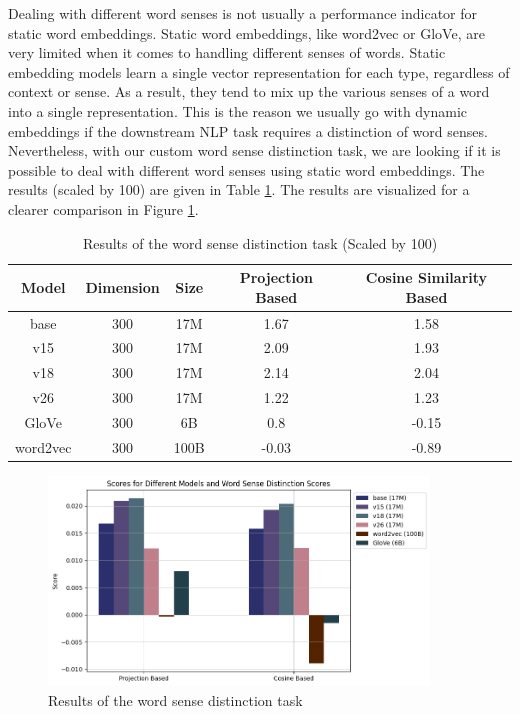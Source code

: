 Dealing with different word senses is not usually a performance indicator for static word embeddings. Static word embeddings, like word2vec or GloVe, are very limited when it comes to handling different senses of words. Static embedding models learn a single vector representation for each type, regardless of context or sense. As a result, they tend to mix up the various senses of a word into a single representation. This is the reason we usually go with dynamic embeddings if the downstream \ac{NLP} task requires a distinction of word senses. Nevertheless, with our custom word sense distinction task, we are looking if it is possible to deal with different word senses using static word embeddings. The results (scaled by 100) are given in Table \ref{tab:word-sense-tab}. The results are visualized for a clearer comparison in Figure \ref{fig:sense-plot}.

\begin{table}[h]
\centering
\begin{tabular}{|ccc|cc|}
\hline
Model & Dimension & Size & Projection Based & Cosine Similarity Based \\ \hline
base & 300 & 17M & 1.67 & 1.58 \\
v15 & 300 & 17M & 2.09 & 1.93 \\
v18 & 300 & 17M & 2.14 & 2.04 \\
v26 & 300 & 17M & 1.22 & 1.23 \\ \hline
GloVe & 300 & 6B & 0.8 & -0.15 \\
word2vec & 300 & 100B & -0.03 & -0.89 \\ \hline
\end{tabular}
\caption{Results of the word sense distinction task (Scaled by 100)}
\label{tab:word-sense-tab}
\end{table}

\begin{figure}[h]
    \centering
    \includegraphics[width=0.9\textwidth]{img/sense-plot.png}
    \caption{Results of the word sense distinction task}
    \label{fig:sense-plot}
\end{figure}

